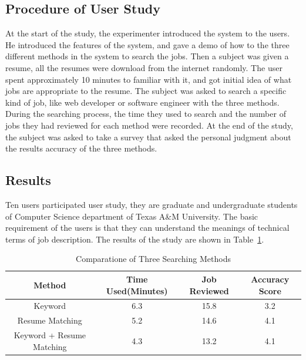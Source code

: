 \subsection{Procedure of User Study}

At the start of the study, the experimenter introduced the system to the users. He introduced the features of the system, and gave a demo of how to the three different methods in the system to search the jobs. Then a subject was given a resume, all the resumes were download from the internet randomly. The user spent approximately 10 minutes to familiar with it, and got initial idea of what jobs are appropriate to the resume. The subject was asked to search a specific kind of job, like web developer or software engineer with the three methods. During the searching process, the time they used to search and the number of jobs they had reviewed for each method were recorded.  At the end of the study, the subject was asked to take a survey that asked  the personal judgment about the results accuracy of the three methods.


\subsection{Results}


Ten users participated user study, they are graduate and undergraduate students of Computer Science department of Texas A\&M University. The basic requirement of the users is that they can understand the meanings of technical terms of job description. The results of the study are shown in Table~\ref{tab:methodcompare}.


\begin{table}[ht]
\caption{Comparatione of Three Searching Methods } %
\centering %
\begin{tabular}{  | c | c | c | c | }
 \hline
 Method                    &  Time Used(Minutes)    & Job Reviewed & Accuracy Score  \\
 \hline
 Keyword                   & 6.3                    & 15.8         &       3.2         \\
 \hline
 Resume Matching           & 5.2                    & 14.6         &       4.1         \\
  \hline
 Keyword + Resume Matching & 4.3                    & 13.2         &       4.1       \\
  \hline
\end{tabular}
\label{tab:methodcompare} %
\end{table}


